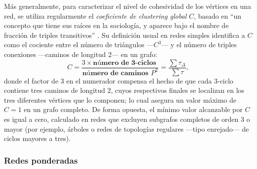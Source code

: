 \documentclass[letterpaper, 11pt]{book}
\theoremstyle{definition}
\theoremstyle{remark}
\begin{document}
Más generalmente, para caracterizar el nivel de cohesividad de los vértices en una red, se utiliza regularmente el \emph{coeficiente de clustering global} $C$, basado en ``un concepto que tiene sus raíces en la sociología, y aparece bajo el nombre de fracción de triples transitivos'' \citep[49]{2002_Barabasi_MechanicsOfComplexNetworks}. 
Su definición usual en redes simples identifica a $C$ como el cociente entre el número de triángulos ---$C^{3}$--- y el número de triples conexiones ---caminos de longitud 2--- en un grafo: 
\begin{equation}\label{eq:clustering}
    C = 
    \frac{3 \times \textbf{número de 3-ciclos } }{\textbf{número de caminos } P^{2} } = 
    \frac{ \sum \tau_{\Delta} }{ \sum \tau },
\end{equation}
donde el factor de 3 en el numerador compensa el hecho de que cada 3-ciclo contiene tres caminos de longitud 2, cuyos respectivos finales se localizan en los tres diferentes vértices que lo componen; lo cual asegura un valor máximo de $C=1$ en un grafo completo. 
De forma opuesta, el mínimo valor alcanzable por $C$ es igual a cero, calculado en redes que excluyen subgrafos completos de orden 3 o mayor (por ejemplo, árboles o redes de topologías regulares ---tipo enrejado--- de ciclos mayores a tres). 



\subsubsection{Redes ponderadas}
\label{sec:clustering_Vponderada}
\end{document}

